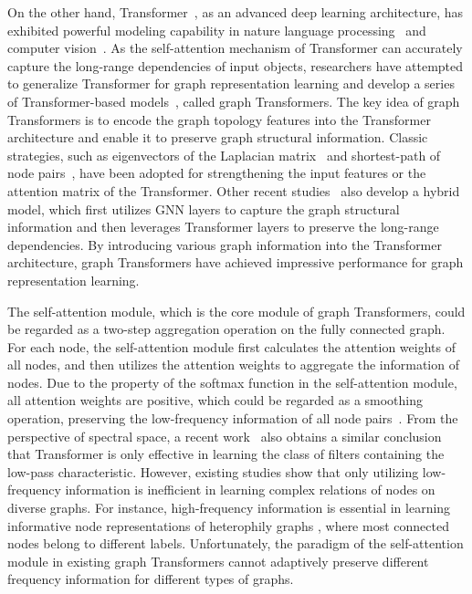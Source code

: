 \documentclass[sigconf, screen]{acmart}
\begin{document}
On the other hand, Transformer~\cite{transformer}, as an advanced deep learning architecture, has exhibited powerful modeling capability in nature language processing~\cite{transformer} and computer vision~\cite{vit}. 
As the self-attention mechanism of Transformer can accurately capture the long-range dependencies of input objects, researchers have attempted to generalize Transformer for graph representation learning and develop a series of Transformer-based models~\cite{san,sat,ansgt,nodeformer,nagphormer}, called graph Transformers. 
The key idea of graph Transformers is to encode the graph topology features into the Transformer architecture and enable it to preserve graph structural information.
Classic strategies, such as eigenvectors of the Laplacian matrix~\cite{san,gt} and shortest-path of node pairs~\cite{graphormer}, have been adopted for strengthening the input features or the attention matrix of the Transformer.
Other recent studies~\cite{graphtrans,sat} also develop a hybrid model, which first utilizes GNN layers to capture the graph structural information and then leverages Transformer layers to preserve the long-range dependencies.
By introducing various graph information into the Transformer architecture, graph Transformers have achieved impressive performance for graph representation learning.

The self-attention module, which is the core module of graph Transformers, could be regarded as a two-step aggregation operation on the fully connected graph.
For each node, the self-attention module first calculates the attention weights of all nodes, and then utilizes the attention weights to aggregate the information of nodes. 
Due to the property of the softmax function in the self-attention module, all attention weights are positive, which could be regarded as a smoothing operation, preserving the low-frequency information of all node pairs~\cite{fagcn}.
From the perspective of spectral space, a recent work~\cite{feta} also obtains a similar conclusion that Transformer is only effective in learning the class of filters containing the low-pass characteristic.
However, existing studies \cite{fagcn,ggcn,gprgnn} show that only utilizing low-frequency information is inefficient in learning complex relations of nodes on diverse graphs.
For instance, high-frequency information is essential in learning informative node representations of heterophily graphs \cite{fagcn}, where most connected nodes belong to different labels. 
Unfortunately, the paradigm of the self-attention module in existing graph Transformers cannot adaptively preserve different frequency information for different types of graphs.
\end{document}
